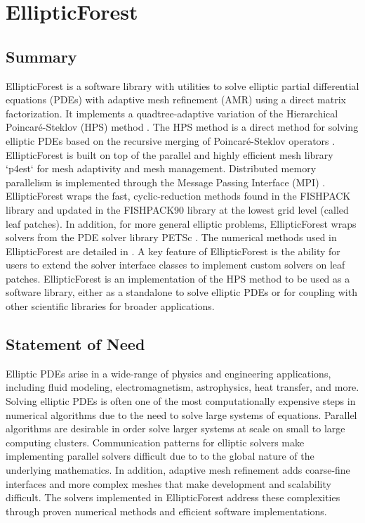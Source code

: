 \section{EllipticForest}


\subsection{Summary}

EllipticForest is a software library with utilities to solve elliptic partial differential equations (PDEs) with adaptive mesh refinement (AMR) using a direct matrix factorization. It implements a quadtree-adaptive variation of the Hierarchical Poincaré-Steklov (HPS) method \citep{gillman2014direct}. The HPS method is a direct method for solving elliptic PDEs based on the recursive merging of Poincaré-Steklov operators \citep{quarteroni1991theory}. EllipticForest is built on top of the parallel and highly efficient mesh library `p4est` \citep{burstedde2011p4est} for mesh adaptivity and mesh management. Distributed memory parallelism is implemented through the Message Passing Interface (MPI) \citep{mpi41}. EllipticForest wraps the fast, cyclic-reduction methods found in the FISHPACK \citep{swarztrauber1999fishpack} library and updated in the FISHPACK90 \citep{adams2016fishpack90} library at the lowest grid level (called leaf patches). In addition, for more general elliptic problems, EllipticForest wraps solvers from the PDE solver library PETSc \citep{anl2023petsc}. The numerical methods used in EllipticForest are detailed in \citep{chipman2024fast}. A key feature of EllipticForest is the ability for users to extend the solver interface classes to implement custom solvers on leaf patches. EllipticForest is an implementation of the HPS method to be used as a software library, either as a standalone to solve elliptic PDEs or for coupling with other scientific libraries for broader applications.

\subsection{Statement of Need}

Elliptic PDEs arise in a wide-range of physics and engineering applications, including fluid modeling, electromagnetism, astrophysics, heat transfer, and more. Solving elliptic PDEs is often one of the most computationally expensive steps in numerical algorithms due to the need to solve large systems of equations. Parallel algorithms are desirable in order solve larger systems at scale on small to large computing clusters. Communication patterns for elliptic solvers make implementing parallel solvers difficult due to to the global nature of the underlying mathematics. In addition, adaptive mesh refinement adds coarse-fine interfaces and more complex meshes that make development and scalability difficult. The solvers implemented in EllipticForest address these complexities through proven numerical methods and efficient software implementations.

